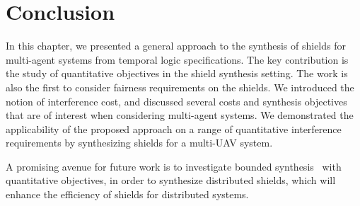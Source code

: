 \section{Conclusion}
\label{sec_concl}
In this chapter, we presented a general approach to the synthesis of shields for multi-agent systems from temporal logic specifications. The key contribution is the study of quantitative objectives in the shield synthesis setting. The work is also the first to consider fairness requirements on the shields. We introduced the notion of interference cost, and discussed several costs and synthesis objectives that are of interest when considering multi-agent systems. We demonstrated the applicability of the proposed approach on a range of quantitative interference requirements by synthesizing shields for a multi-UAV system.

A promising  avenue for future work is to investigate bounded synthesis~\cite{FinkbeinerS13} with quantitative objectives, in order to synthesize distributed shields, which will enhance the efficiency of shields for distributed systems.

